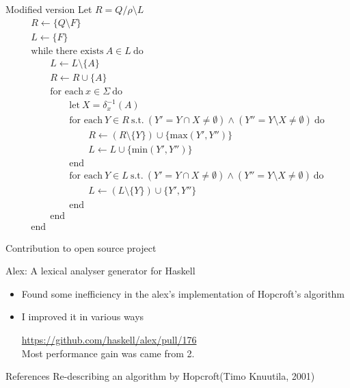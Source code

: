 \documentclass{beamer}
\begin{document}
\begin{frame}{Modified version}
  \footnotesize
  {\color{blue} Let \( R = Q/\rho \setminus L \)}
  \[
    \begin{array}{l}
      R \leftarrow \{ Q \setminus F \} \\
      L \leftarrow \{ F \} \\
      \text{while there exists} \ A \in L \ \text{do} \\
      \qquad L \leftarrow L \setminus \{A\} \\
      \qquad R \leftarrow R \cup \{A\} \\
      \qquad \text{for each} \ x \in \Sigma \ \text{do} \\
      \qquad \qquad \text{let} \ X = \delta_x^{-1}(A) \\
      \qquad \qquad \text{for each} \ Y \in R \ \text{s.t.} \
          (Y' = Y \cap X \neq \emptyset) \wedge (Y'' = Y \setminus X \neq \emptyset) \ \text{do} \\
      \qquad \qquad \qquad R \leftarrow (R \setminus \{Y\}) \cup \{\text{max}(Y', Y'')\} \\
      \qquad \qquad \qquad L \leftarrow L \cup \{\text{min}(Y', Y'')\} \\
      \qquad \qquad \text{end} \\
      \qquad \qquad \text{for each} \ Y \in L \ \text{s.t.} \
          (Y' = Y \cap X \neq \emptyset) \wedge (Y'' = Y \setminus X \neq \emptyset) \ \text{do} \\
      \qquad \qquad \qquad L \leftarrow (L \setminus \{Y\}) \cup \{Y', Y''\} \\
      \qquad \qquad \text{end} \\
      \qquad \text{end} \\
      \text{end}
    \end{array}
  \]
\end{frame}

\begin{frame}{Contribution to open source project}
  \begin{block}{Alex: A lexical analyser generator for Haskell}
    \begin{itemize}
      \item
        Found some inefficiency in the alex's implementation of Hopcroft's algorithm
        \pause
      \item
        I improved it in various ways
        \url{https://github.com/haskell/alex/pull/176} \\
        \pause
        \alert<3>{Most performance gain was came from 2.}
    \end{itemize}
  \end{block}
\end{frame}

\begin{frame}{References}
  Re-describing an algorithm by Hopcroft(Timo Knuutila, 2001)
\end{frame}
\end{document}
